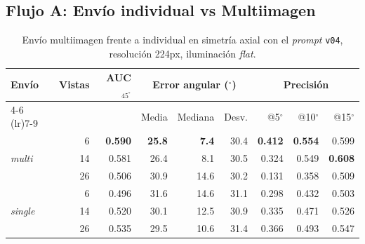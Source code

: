 \newpage

\subsection{Flujo A: Envío individual vs Multiimagen}

% 

\begin{table}[H]
\centering
\caption{Envío multiimagen frente a individual en simetría axial con el \textit{prompt} \texttt{v04}, resolución 224px, iluminación \textit{flat}.}
\label{tab:nov_axis_modo_envio}
\footnotesize
\setlength{\tabcolsep}{3pt}
\renewcommand{\arraystretch}{0.95}

\begin{tabular*}{\textwidth}{@{\extracolsep{\fill}}lrrrrrrrr@{}}
\toprule
\multirow{2}{*}{Envío} & \multirow{2}{*}{Vistas} & \multirow{2}{*}{AUC$_{45^\circ}$} & \multicolumn{3}{c}{Error angular ($^\circ$)} & \multicolumn{3}{c}{Precisión} \\
\cmidrule(lr){4-6} \cmidrule(lr){7-9}
 &  &  & Media & Mediana & Desv. & @5$^\circ$ & @10$^\circ$ & @15$^\circ$ \\
\midrule
\multirow{3}{*}{\textit{multi}} & 6 & \textbf{0.590} & \textbf{25.8} & \textbf{7.4} & 30.4 & \textbf{0.412} & \textbf{0.554} & 0.599 \\
 & 14 & 0.581 & 26.4 & 8.1 & 30.5 & 0.324 & 0.549 & \textbf{0.608} \\
 & 26 & 0.506 & 30.9 & 14.6 & 30.2 & 0.131 & 0.358 & 0.509 \\
\midrule
\multirow{3}{*}{\textit{single}} & 6 & 0.496 & 31.6 & 14.6 & 31.1 & 0.298 & 0.432 & 0.503 \\
 & 14 & 0.520 & 30.1 & 12.5 & 30.9 & 0.335 & 0.471 & 0.526 \\
 & 26 & 0.535 & 29.5 & 10.6 & 31.4 & 0.366 & 0.493 & 0.547 \\
\bottomrule
\end{tabular*}

\vspace{2ex}


\end{table}
